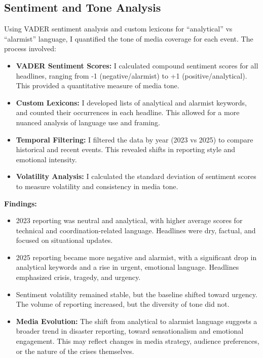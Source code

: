 \documentclass[12pt]{article}
\begin{document}
\subsection{Sentiment and Tone Analysis}
Using VADER sentiment analysis and custom lexicons for “analytical” vs “alarmist” language, I quantified the tone of media coverage for each event. The process involved:
\begin{itemize}
    \item \textbf{VADER Sentiment Scores:} I calculated compound sentiment scores for all headlines, ranging from -1 (negative/alarmist) to +1 (positive/analytical). This provided a quantitative measure of media tone.
    \item \textbf{Custom Lexicons:} I developed lists of analytical and alarmist keywords, and counted their occurrences in each headline. This allowed for a more nuanced analysis of language use and framing.
    \item \textbf{Temporal Filtering:} I filtered the data by year (2023 vs 2025) to compare historical and recent events. This revealed shifts in reporting style and emotional intensity.
    \item \textbf{Volatility Analysis:} I calculated the standard deviation of sentiment scores to measure volatility and consistency in media tone.
\end{itemize}

\textbf{Findings:}
\begin{itemize}
    \item 2023 reporting was neutral and analytical, with higher average scores for technical and coordination-related language. Headlines were dry, factual, and focused on situational updates.
    \item 2025 reporting became more negative and alarmist, with a significant drop in analytical keywords and a rise in urgent, emotional language. Headlines emphasized crisis, tragedy, and urgency.
    \item Sentiment volatility remained stable, but the baseline shifted toward urgency. The volume of reporting increased, but the diversity of tone did not.
    \item \textbf{Media Evolution:} The shift from analytical to alarmist language suggests a broader trend in disaster reporting, toward sensationalism and emotional engagement. This may reflect changes in media strategy, audience preferences, or the nature of the crises themselves.
\end{itemize}
\end{document}

